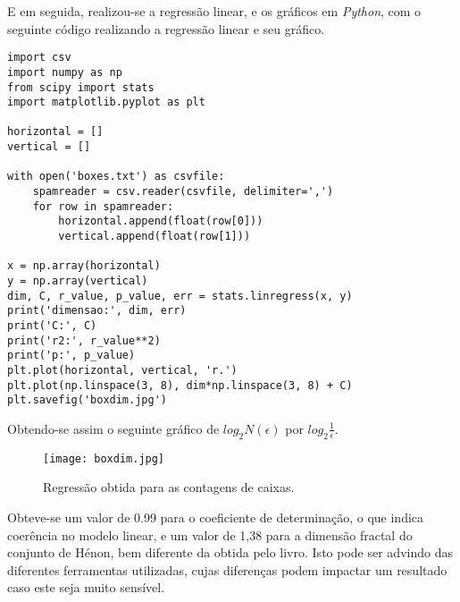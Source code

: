 \documentclass{article}[twocolumn]
\begin{document}
	E em seguida, realizou-se a regress\~ao linear, e os gr\'aficos em \textit{Python},
	com o seguinte c\'odigo realizando a regress\~ao linear e seu gr\'afico.
	\begin{verbatim}
import csv
import numpy as np
from scipy import stats
import matplotlib.pyplot as plt

horizontal = []
vertical = []

with open('boxes.txt') as csvfile:
    spamreader = csv.reader(csvfile, delimiter=',')
    for row in spamreader:
        horizontal.append(float(row[0]))
        vertical.append(float(row[1]))

x = np.array(horizontal)
y = np.array(vertical)
dim, C, r_value, p_value, err = stats.linregress(x, y)
print('dimensao:', dim, err)
print('C:', C)
print('r2:', r_value**2)
print('p:', p_value)
plt.plot(horizontal, vertical, 'r.')
plt.plot(np.linspace(3, 8), dim*np.linspace(3, 8) + C)
plt.savefig('boxdim.jpg')

	\end{verbatim}
	Obtendo-se assim o seguinte gr\'afico de $log_{2}N(\epsilon)$ por
	$log_{2}\frac{1}{\epsilon}$.
	\begin{figure}[H]
		\centering
		\texttt{[image: boxdim.jpg]}
		\caption{Regress\~ao obtida para as contagens de caixas.}
	\end{figure}
	Obteve-se um valor de 0.99 para o coeficiente de determina\c{c}\~ao, o que indica
	coer\^encia no modelo linear, e um valor de 1,38 para a dimens\~ao fractal do
	conjunto de H\'enon, bem diferente da obtida pelo livro. Isto pode ser advindo das
	diferentes ferramentas utilizadas, cujas diferen\c{c}as podem impactar um resultado
	caso este seja muito sens\'ivel.
\end{document}
